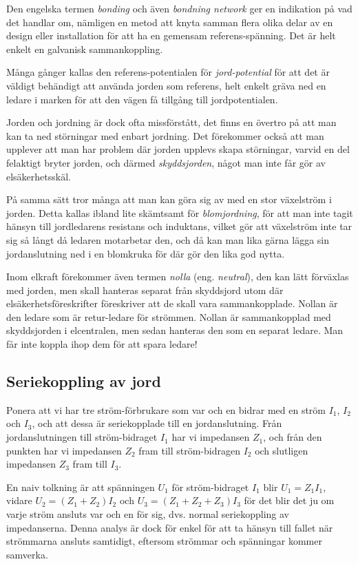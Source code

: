 Den engelska termen \emph{bonding} och även \emph{bondning network} ger en
indikation på vad det handlar om, nämligen en metod att knyta samman flera
olika delar av en design eller installation för att ha en gemensam
referens-spänning. Det är helt enkelt en galvanisk sammankoppling.

Många gånger kallas den referens-potentialen för \emph{jord-potential} för att
det är väldigt behändigt att använda jorden som referens, helt enkelt gräva ned
en ledare i marken för att den vägen få tillgång till jordpotentialen.

Jorden och jordning är dock ofta missförstått, det finns en övertro på att man
kan ta ned störningar med enbart jordning. Det förekommer också att man
upplever att man har problem där jorden upplevs skapa störningar, varvid en
del felaktigt bryter jorden, och därmed \emph{skyddsjorden}, något man inte
får gör av elsäkerhetsskäl.

På samma sätt tror många att man kan göra sig av med en stor växelström i
jorden. Detta kallas ibland lite skämtsamt för \emph{blomjordning}, för att
man inte tagit hänsyn till jordledarens resistans och induktans, vilket gör
att växelström inte tar sig så långt då ledaren motarbetar den, och då kan man
lika gärna lägga sin jordanslutning ned i en blomkruka för där gör den lika
god nytta.

Inom elkraft förekommer även termen \emph{nolla} (eng. \emph{neutral}), den
kan lätt förväxlas med jorden, men skall hanteras separat från skyddsjord utom
där elsäkerhetsföreskrifter föreskriver att de skall vara sammankopplade.
Nollan är den ledare som är retur-ledare för strömmen. Nollan är sammankopplad
med skyddsjorden i elcentralen, men sedan hanteras den som en separat ledare.
Man får inte koppla ihop dem för att spara ledare!

\subsection{Seriekoppling av jord}

Ponera att vi har tre ström-förbrukare som var och en bidrar med en ström
\(I_1\), \(I_2\) och \(I_3\), och att dessa är seriekopplade till en
jordanslutning. Från jordanslutningen till ström-bidraget \(I_1\) har vi
impedansen \(Z_1\), och från den punkten har vi impedansen \(Z_2\) fram till
ström-bidragen \(I_2\) och slutligen impedansen \(Z_3\) fram till \(I_3\).

En naiv tolkning är att spänningen \(U_1\) för ström-bidraget \(I_1\) blir
\(U_1 = Z_1 I_1\), vidare \(U_2 = (Z_1 + Z_2) I_2\) och
\(U_3 = (Z_1 + Z_2 + Z_3) I_3\) för det blir det ju om varje ström ansluts var
och en för sig, dvs. normal seriekoppling av impedanserna. Denna analys är
dock för enkel för att ta hänsyn till fallet när strömmarna ansluts samtidigt,
eftersom strömmar och spänningar kommer samverka.

